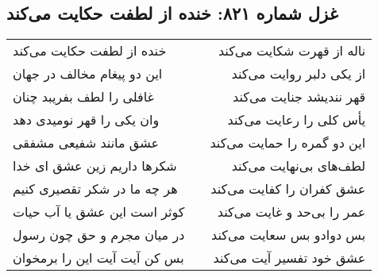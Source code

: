 \begin{center}
\section*{غزل شماره ۸۲۱: خنده از لطفت حکایت می‌کند}
\label{sec:0821}
\begin{longtable}{l p{0.5cm} r}
خنده از لطفت حکایت می‌کند
&&
ناله از قهرت شکایت می‌کند
\\
این دو پیغام مخالف در جهان
&&
از یکی دلبر روایت می‌کند
\\
غافلی را لطف بفریبد چنان
&&
قهر نندیشد جنایت می‌کند
\\
وان یکی را قهر نومیدی دهد
&&
یأس کلی را رعایت می‌کند
\\
عشق مانند شفیعی مشفقی
&&
این دو گمره را حمایت می‌کند
\\
شکرها داریم زین عشق ای خدا
&&
لطف‌های بی‌نهایت می‌کند
\\
هر چه ما در شکر تقصیری کنیم
&&
عشق کفران را کفایت می‌کند
\\
کوثر است این عشق یا آب حیات
&&
عمر را بی‌حد و غایت می‌کند
\\
در میان مجرم و حق چون رسول
&&
بس دوادو بس سعایت می‌کند
\\
بس کن آیت آیت این را برمخوان
&&
عشق خود تفسیر آیت می‌کند
\\
\end{longtable}
\end{center}
